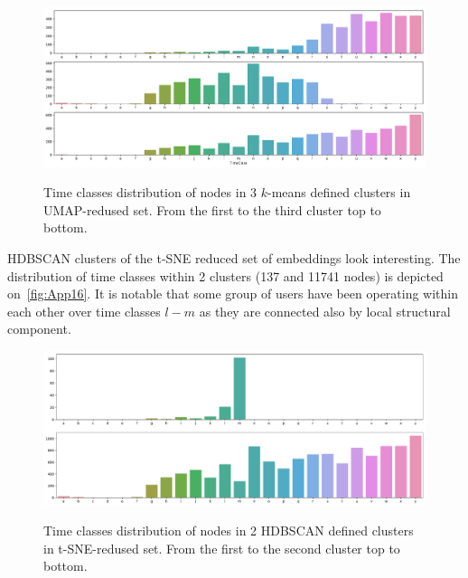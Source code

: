 \begin{figure}[!ht]
	\centering
	\includegraphics[width=1.0\textwidth]{images/appendix/App15.pdf}\\
	\caption{Time classes distribution of nodes in 3 $k$-means defined clusters in UMAP-redused set. From the first to the third cluster top to bottom.}
	\label{fig:App15}
\end{figure}

HDBSCAN clusters of the t-SNE reduced set of embeddings look interesting. The distribution of time classes within 2 clusters (137 and 11741 nodes) is depicted on~\autoref{fig:App16}. It is notable that some group of users have been operating within each other over time classes $l-m$ as they are connected also by local structural component.

\begin{figure}[!ht]
	\centering
	\includegraphics[width=1.0\textwidth]{images/appendix/App16.pdf}\\
	\caption{Time classes distribution of nodes in 2 HDBSCAN defined clusters in t-SNE-redused set. From the first to the second cluster top to bottom.}
	\label{fig:App16}
\end{figure}
